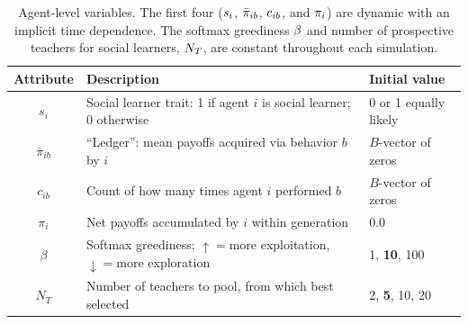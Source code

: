 \documentclass[letterpaper,11.5pt]{scrartcl}
\begin{document}

\begin{table}[h]
  \vspace{2em}
  \caption{Agent-level variables. The first four ($\protect s_i$, $\protect
    \bar\pi_{ib}$, $\protect c_{ib}$,
  and $\protect \pi_i$) are dynamic with an implicit time dependence. The softmax
greediness $\protect \beta$ and number of prospective teachers for social learners,
$\protect N_T$, are constant throughout each simulation.}
    \label{tab:modelParameters}
    \centering %
    \begin{tabular}{cp{4.0in}p{1.25in}} \toprule

        Attribute & Description & Initial value \\ 

        \midrule  

        $s_i$  & Social learner trait: 1 if agent $i$ is social learner; 0 otherwise & 0
        or 1 equally likely \\

        $\bar\pi_{ib}$ & ``Ledger'': mean payoffs acquired via behavior $b$ by $i$ 
                       & $B$-vector of zeros \\

        $c_{ib}$ & Count of how many times agent $i$ performed $b$ 
              & $B$-vector of zeros \\

        $\pi_i$ & Net payoffs accumulated by $i$ within generation & 0.0 \\

        $\beta$ & Softmax greediness; $\uparrow=$more exploitation, $\downarrow=$more
                    exploration 
               & 1, \textbf{10}, 100 \\
        
        $N_T$    & Number of teachers to pool, from which best selected 
                 & 2, \textbf{5}, 10, 20  \\

        \bottomrule
    \end{tabular}
\end{table}
\end{document}
